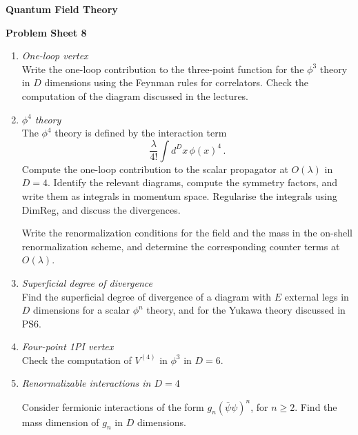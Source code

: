 \documentclass[12pt,a4paper]{article}
\newcommand{\psibar}{\bar{\psi}}
\begin{document}
\begin{center}
\textbf{ Quantum Field Theory}\\[\baselineskip]
\end{center}
\textbf{ Problem Sheet 8}

\begin{enumerate}
\item \emph{ One-loop vertex} \\

  Write the one-loop contribution to the three-point function for the
  $\phi^3$ theory in $D$ dimensions using the Feynman rules for
  correlators. Check the computation of the diagram discussed in the
  lectures. 
  
  \bigskip
  
\item \emph{ $\phi^4$ theory}\\

  The $\phi^4$ theory is defined by the interaction term
  \[
    \frac{\lambda}{4!} \int d^Dx\, \phi(x)^4\, .
  \]
  Compute the one-loop contribution to the scalar propagator at
  $O(\lambda)$ in $D=4$. Identify the relevant diagrams, compute the symmetry
  factors, and write them as integrals in momentum space. Regularise
  the integrals using DimReg, and discuss the divergences.

  Write the renormalization conditions for the field and the mass in
  the on-shell renormalization scheme, and determine the corresponding
  counter terms at $O(\lambda)$.
  
  \bigskip

\item \emph{ Superficial degree of  divergence}\\

  Find the superficial degree of divergence of a diagram with $E$
  external legs in $D$ dimensions for a scalar $\phi^n$ theory, and for
  the Yukawa theory discussed in PS6.

  \bigskip 
  
\item \emph{ Four-point 1PI vertex}\\
  
  Check the computation of $V^{(4)}$ in $\phi^3$ in $D=6$.
  
  \bigskip
  
\item \emph{ Renormalizable interactions in $D=4$}
  
  Consider fermionic interactions of the form $g_n (\psibar\psi)^n$,
  for $n \geq 2$. Find the mass dimension of $g_n$ in $D$ dimensions.
  

\end{enumerate}
\end{document}
